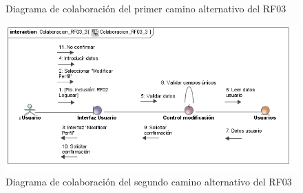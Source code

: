 \begin{itemize}
\begin{figure} [!htb]
		\caption{Diagrama de colaboración del primer camino alternativo del RF03}
		\label{fig:diagramaColaboracion_RF03_2}
	\end{figure}
	\begin{figure} [!htb]
		\centering
		\includegraphics[width=\linewidth,height=\textheight,keepaspectratio]{Images/Diagramas/04_Colaboracion_RF03_3}
		\caption{Diagrama de colaboración del segundo camino alternativo del RF03}
		\label{fig:diagramaColaboracion_RF03_3}
	\end{figure}
	

\end{itemize}
